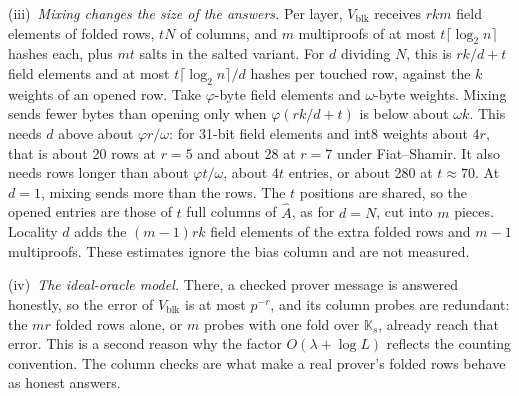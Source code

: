 \begin{remark}
(iii)~\emph{Mixing changes the size of the answers.} Per layer, $V_{\mathrm{blk}}$ receives $rkm$
field elements of folded rows, $tN$ of columns, and $m$ multiproofs of at most $t\lceil\log_2n\rceil$
hashes each, plus $mt$ salts in the salted variant. For $d$ dividing $N$, this is $rk/d+t$ field
elements and at most $t\lceil\log_2n\rceil/d$ hashes per touched row, against the $k$ weights of an
opened row. Take $\varphi$-byte field elements and $\omega$-byte weights. Mixing sends fewer bytes
than opening only when $\varphi(rk/d+t)$ is below about $\omega k$. This needs $d$ above about
$\varphi r/\omega$: for 31-bit field elements and int8 weights about $4r$, that is about 20 rows at
$r=5$ and about 28 at $r=7$ under Fiat--Shamir. It also needs rows longer than about $\varphi
t/\omega$, about $4t$ entries, or about 280 at $t\approx70$. At $d=1$, mixing sends more than the rows.
The $t$ positions are shared, so the opened entries are those of $t$ full columns of $\hat A$, as for
$d=N$, cut into $m$ pieces. Locality $d$ adds the $(m-1)rk$ field elements of the extra folded rows
and $m-1$ multiproofs. These estimates ignore the bias column and are not measured.

(iv)~\emph{The ideal-oracle model.} There, a checked prover message is answered honestly, so the
error of $V_{\mathrm{blk}}$ is at most $p^{-r}$, and its column probes are redundant: the $mr$
folded rows alone, or $m$ probes with one fold over $\mathbb K_s$, already reach that error. This is
a second reason why the factor $O(\lambda+\log L)$ reflects the counting convention. The column
checks are what make a real prover's folded rows behave as honest answers.
\end{remark}

